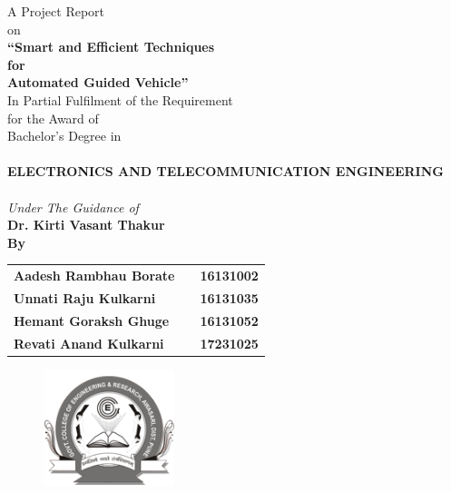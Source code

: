 \newpage
\begin{center}
\thispagestyle{empty}
\Large{A Project Report\\ \large{on}}\\[0.4cm]
\LARGE{{\textbf{``Smart and Efficient Techniques \\ for \\ Automated Guided Vehicle''}}}\\[0.3cm]
\large{In Partial Fulfilment of the Requirement \\ for the Award of \\ Bachelor's Degree in\\}
\vspace{-0.3cm}
\Large{\textbf{\\ELECTRONICS AND TELECOMMUNICATION ENGINEERING\\}}
\vspace{-0.3cm}
\large{\textit{\\Under The Guidance of}}\\
\large{\textbf{Dr. Kirti Vasant Thakur}}\\
\large{\textbf{By}}\\
\begin{table}[h]
\centering
\Large{
\begin{tabular}{>{\bfseries}lc>{\bfseries}r}
Aadesh Rambhau Borate & & 16131002\\Unnati Raju Kulkarni & & 16131035\\Hemant Goraksh Ghuge & & 16131052\\Revati Anand Kulkarni & & 17231025
\end{tabular}}
\end{table}
\vspace{-0.5cm}
\begin{figure}[htbp]
\centering
\includegraphics[width=1.5in]{project/images/govt-college-logo.png}
\end{figure}

\end{center}
